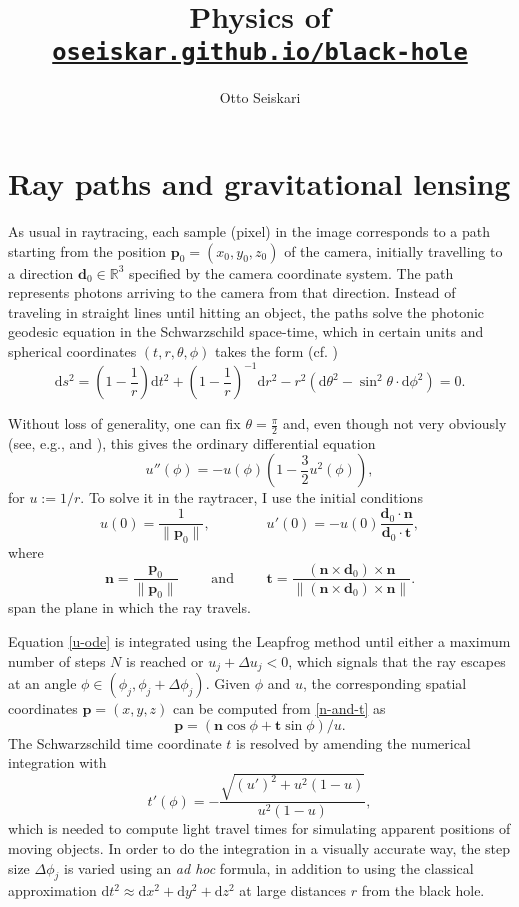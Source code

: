 \documentclass[a4paper,12pt]{article}
\title{Physics of \href{https://oseiskar.github.io/black-hole}{\tt oseiskar.github.io/black-hole}}
\author{Otto Seiskari}
\date{}
\def\mb{\boldsymbol}
\def\d{{\mathrm d}}
\begin{document}
\maketitle

\section*{Ray paths and gravitational lensing}

As usual in raytracing, each sample (pixel) in the image corresponds to a path starting from the position ${\mb p}_0 = (x_0, y_0, z_0)$ of the camera, initially travelling to a direction $\mb d_0 \in \mathbb R^3$ specified by the camera coordinate system. The path represents photons arriving to the camera from that direction. 
Instead of traveling in straight lines until hitting an object, the paths solve the photonic geodesic equation in the Schwarzschild space-time, which in certain units and spherical coordinates $(t,r,\theta,\phi)$ takes the form (cf. \cite[\S 4.2.1]{astro-princeton})
$$
%
    \d s^2 = \left(1-\frac1r\right)\d t^2 + \left(1-\frac1r\right)^{-1} \d r^2 - r^2(\d \theta^2-\sin^2\theta \cdot \d \phi^2) = 0.
$$

Without loss of generality, one can fix $\theta = \frac\pi2$ and, even though not very obviously (see, e.g., \cite{wikipedia:sch} and \cite{antonell}), this gives the ordinary differential equation
\begin{equation}\label{u-ode}
    u''(\phi) = -u(\phi) \left(1-\frac32u^2(\phi)\right),
\end{equation}
for $u := 1/r$.
To solve it in the raytracer, I use the initial conditions
\def\n{\mb n}
\def\p{{\mb p}_0}
\def\v{\mb v}
\def\t{\mb t}
\def\bd{{\mb d}_0}
$$
%
    u(0) = \frac1{\|\p\|}, \qquad \qquad
    u'(0) = -u(0) \frac{\bd \cdot \n}{\bd \cdot \t},
$$
where
\begin{equation}\label{n-and-t}
    \n = \frac{\p}{\|\p\|}
    \qquad \mbox{ and } \qquad
    \t = \frac{(\n \times \bd) \times \n}{\|(\n \times \bd) \times \n\|}.
\end{equation}
span the plane in which the ray travels.

Equation \eqref{u-ode} is integrated using the Leapfrog method until either a maximum number of steps $N$ is reached or $u_j + \Delta u_j < 0$, which signals that the ray escapes at an angle $\phi \in (\phi_j, \phi_j + \Delta \phi_j)$.
Given $\phi$ and $u$, the corresponding spatial coordinates $\mb p = (x,y,z)$ can be computed from \eqref{n-and-t} as
$$
  \mb p = \left( \n \cos \phi  + \t \sin \phi\right) / u.
$$
The Schwarzschild time coordinate $t$ is resolved by amending the numerical integration with
$$
 t'(\phi) = -\frac{\sqrt{(u')^2 + u^2(1-u)}}{u^2(1-u)},
$$
which is needed to compute light travel times for simulating apparent positions of moving objects.
In order to do the integration in a visually accurate way, the step size $\Delta \phi_j$ is varied using an \emph{ad hoc} formula, %
in addition to using the classical approximation $\d t^2 \approx \d x^2 + \d y^2 + \d z^2$ at large distances $r$ from the black hole.
\end{document}
